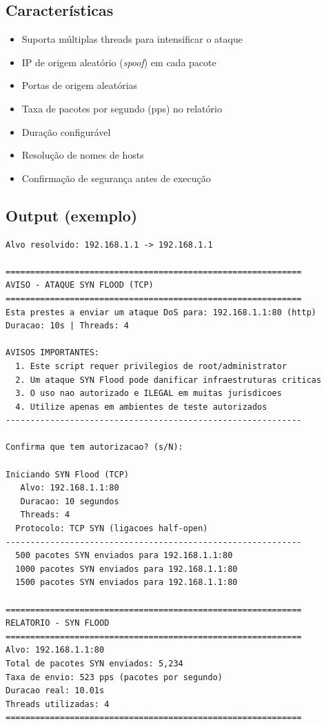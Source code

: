 \documentclass[11pt,a4paper]{article}
\begin{document}
\subsection{Caracter\'isticas}
\begin{itemize}
  \item Suporta m\'ultiplas threads para intensificar o ataque
  \item IP de origem aleat\'orio (\textit{spoof}) em cada pacote
  \item Portas de origem aleat\'orias
  \item Taxa de pacotes por segundo (pps) no relat\'orio
  \item Dura\c{c}\~ao configur\'avel
  \item Resolu\c{c}\~ao de nomes de hosts
  \item Confirma\c{c}\~ao de seguran\c{c}a antes de execu\c{c}\~ao
\end{itemize}

\subsection{Output (exemplo)}
\begin{lstlisting}[style=bash]
Alvo resolvido: 192.168.1.1 -> 192.168.1.1

============================================================
AVISO - ATAQUE SYN FLOOD (TCP)
============================================================
Esta prestes a enviar um ataque DoS para: 192.168.1.1:80 (http)
Duracao: 10s | Threads: 4

AVISOS IMPORTANTES:
  1. Este script requer privilegios de root/administrator
  2. Um ataque SYN Flood pode danificar infraestruturas criticas
  3. O uso nao autorizado e ILEGAL em muitas jurisdicoes
  4. Utilize apenas em ambientes de teste autorizados
------------------------------------------------------------

Confirma que tem autorizacao? (s/N):

Iniciando SYN Flood (TCP)
   Alvo: 192.168.1.1:80
   Duracao: 10 segundos
   Threads: 4
  Protocolo: TCP SYN (ligacoes half-open)
------------------------------------------------------------
  500 pacotes SYN enviados para 192.168.1.1:80
  1000 pacotes SYN enviados para 192.168.1.1:80
  1500 pacotes SYN enviados para 192.168.1.1:80

============================================================
RELATORIO - SYN FLOOD
============================================================
Alvo: 192.168.1.1:80
Total de pacotes SYN enviados: 5,234
Taxa de envio: 523 pps (pacotes por segundo)
Duracao real: 10.01s
Threads utilizadas: 4
============================================================
\end{lstlisting}
\end{document}
